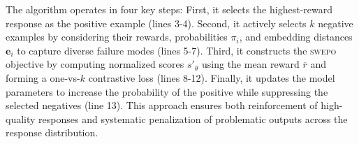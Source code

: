 \vspace{-0.1in}
The algorithm operates in four key steps: First, it selects the highest-reward response as the positive example (lines 3-4). Second, it actively selects $k$ negative examples by considering their rewards, probabilities $\pi_i$, and embedding distances $\mathbf{e}_i$ to capture diverse failure modes (lines 5-7). Third, it constructs the \textsc{swepo} objective by computing normalized scores $s'_\theta$ using the mean reward $\overline{r}$ and forming a one-vs-$k$ contrastive loss (lines 8-12). Finally, it updates the model parameters to increase the probability of the positive while suppressing the selected negatives (line 13). This approach ensures both reinforcement of high-quality responses and systematic penalization of problematic outputs across the response distribution.




